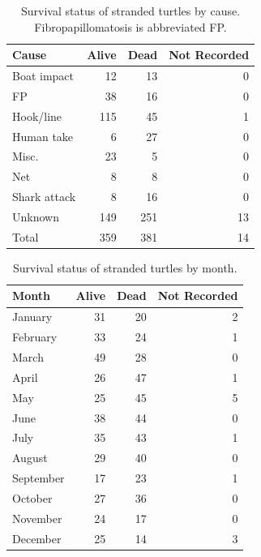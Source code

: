\documentclass[sn-basic,NameDate]{sn-jnl}\usepackage[]{graphicx}\usepackage[]{xcolor}
\newenvironment{knitrout}{}{} %
\begin{document}
\begin{table}[tbp]
\caption{Survival status of stranded turtles by cause. Fibropapillomatosis is abbreviated FP.
}\label{tab:cause_status}
\begin{knitrout}
\color{fgcolor}
\begin{tabular}{lrrr}
\toprule
Cause & Alive & Dead & Not Recorded\\
\midrule
Boat impact & 12 & 13 & 0\\
FP & 38 & 16 & 0\\
Hook/line & 115 & 45 & 1\\
Human take & 6 & 27 & 0\\
Misc. & 23 & 5 & 0\\
Net & 8 & 8 & 0\\
Shark attack & 8 & 16 & 0\\
Unknown & 149 & 251 & 13\\
\addlinespace
Total & 359 & 381 & 14\\
\bottomrule
\end{tabular}

\end{knitrout}
\end{table}

\begin{table}[tbp]
\caption{Survival status of stranded turtles by month.}\label{tab:month_status}
\begin{knitrout}
\color{fgcolor}
\begin{tabular}{lrrr}
\toprule
Month & Alive & Dead & Not Recorded\\
\midrule
January & 31 & 20 & 2\\
February & 33 & 24 & 1\\
March & 49 & 28 & 0\\
April & 26 & 47 & 1\\
May & 25 & 45 & 5\\
June & 38 & 44 & 0\\
July & 35 & 43 & 1\\
August & 29 & 40 & 0\\
September & 17 & 23 & 1\\
October & 27 & 36 & 0\\
November & 24 & 17 & 0\\
December & 25 & 14 & 3\\
\bottomrule
\end{tabular}

\end{knitrout}
\end{table}
\end{document}
